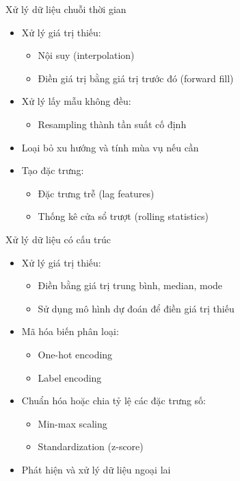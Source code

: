 \documentclass{beamer}
\begin{document}
\begin{frame}{Xử lý dữ liệu chuỗi thời gian}
    \begin{itemize}
        \item Xử lý giá trị thiếu:
        \begin{itemize}
            \item Nội suy (interpolation)
            \item Điền giá trị bằng giá trị trước đó (forward fill)
        \end{itemize}
        \item Xử lý lấy mẫu không đều:
        \begin{itemize}
            \item Resampling thành tần suất cố định
        \end{itemize}
        \item Loại bỏ xu hướng và tính mùa vụ nếu cần
        \item Tạo đặc trưng:
        \begin{itemize}
            \item Đặc trưng trễ (lag features)
            \item Thống kê cửa sổ trượt (rolling statistics)
        \end{itemize}
    \end{itemize}
\end{frame}

\begin{frame}{Xử lý dữ liệu có cấu trúc}
    \begin{itemize}
        \item Xử lý giá trị thiếu:
        \begin{itemize}
            \item Điền bằng giá trị trung bình, median, mode
            \item Sử dụng mô hình dự đoán để điền giá trị thiếu
        \end{itemize}
        \item Mã hóa biến phân loại:
        \begin{itemize}
            \item One-hot encoding
            \item Label encoding
        \end{itemize}
        \item Chuẩn hóa hoặc chia tỷ lệ các đặc trưng số:
        \begin{itemize}
            \item Min-max scaling
            \item Standardization (z-score)
        \end{itemize}
        \item Phát hiện và xử lý dữ liệu ngoại lai
    \end{itemize}
\end{frame}
\end{document}
